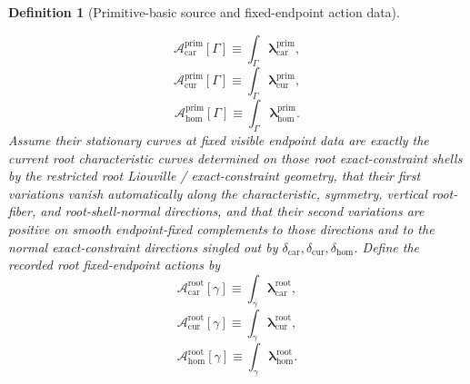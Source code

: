 \documentclass[11pt]{article}
\newcommand{\TensorConstraintGap}{\delta_{\mathrm{car}}}
\newcommand{\CurConstraintGap}{\delta_{\mathrm{cur}}}
\newcommand{\HomConstraintGap}{\delta_{\mathrm{hom}}}
\newcommand{\TensorRootRateForm}{\boldsymbol{\lambda}_{\mathrm{car}}^{\mathrm{root}}}
\newcommand{\CurRootRateForm}{\boldsymbol{\lambda}_{\mathrm{cur}}^{\mathrm{root}}}
\newcommand{\HomRootRateForm}{\boldsymbol{\lambda}_{\mathrm{hom}}^{\mathrm{root}}}
\newcommand{\TensorRootAction}{\mathscr A_{\mathrm{car}}^{\mathrm{root}}}
\newcommand{\CurRootAction}{\mathscr A_{\mathrm{cur}}^{\mathrm{root}}}
\newcommand{\HomRootAction}{\mathscr A_{\mathrm{hom}}^{\mathrm{root}}}
\newcommand{\TensorPrimitiveRateForm}{\boldsymbol{\lambda}_{\mathrm{car}}^{\mathrm{prim}}}
\newcommand{\CurPrimitiveRateForm}{\boldsymbol{\lambda}_{\mathrm{cur}}^{\mathrm{prim}}}
\newcommand{\HomPrimitiveRateForm}{\boldsymbol{\lambda}_{\mathrm{hom}}^{\mathrm{prim}}}
\newcommand{\TensorPrimitiveAction}{\mathscr A_{\mathrm{car}}^{\mathrm{prim}}}
\newcommand{\CurPrimitiveAction}{\mathscr A_{\mathrm{cur}}^{\mathrm{prim}}}
\newcommand{\HomPrimitiveAction}{\mathscr A_{\mathrm{hom}}^{\mathrm{prim}}}
\newtheorem{definition}{Definition}
\begin{document}
\begin{definition}[Primitive-basic source and fixed-endpoint action data]
\begin{enumerate}
    \begin{equation}
    \TensorPrimitiveAction[\Gamma]\equiv\int_\Gamma \TensorPrimitiveRateForm,
    \label{eq:primitive_action_car}
    \end{equation}
    \begin{equation}
    \CurPrimitiveAction[\Gamma]\equiv\int_\Gamma \CurPrimitiveRateForm,
    \label{eq:primitive_action_cur}
    \end{equation}
    \begin{equation}
    \HomPrimitiveAction[\Gamma]\equiv\int_\Gamma \HomPrimitiveRateForm.
    \label{eq:primitive_action_hom}
    \end{equation}
    Assume their stationary curves at fixed visible endpoint data are exactly the current root characteristic curves determined on those root exact-constraint shells by the restricted root Liouville / exact-constraint geometry, that their first variations vanish automatically along the characteristic, symmetry, vertical root-fiber, and root-shell-normal directions, and that their second variations are positive on smooth endpoint-fixed complements to those directions and to the normal exact-constraint directions singled out by \(\TensorConstraintGap,\CurConstraintGap,\HomConstraintGap\). Define the recorded root fixed-endpoint actions by
    \begin{equation}
    \TensorRootAction[\gamma]\equiv\int_\gamma \TensorRootRateForm,
    \label{eq:root_action_from_primitive_car}
    \end{equation}
    \begin{equation}
    \CurRootAction[\gamma]\equiv\int_\gamma \CurRootRateForm,
    \label{eq:root_action_from_primitive_cur}
    \end{equation}
    \begin{equation}
    \HomRootAction[\gamma]\equiv\int_\gamma \HomRootRateForm.
    \label{eq:root_action_from_primitive_hom}
    \end{equation}
\end{enumerate}
\end{definition}
\end{document}
